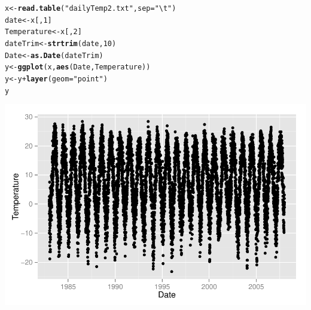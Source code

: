 \documentclass{article}\usepackage{graphicx, color}
\makeatletter
\def\maxwidth{ %
  \ifdim\Gin@nat@width>\linewidth
    \linewidth
  \else
    \Gin@nat@width
  \fi
}
\newcommand{\hlfunctioncall}[1]{\textcolor[rgb]{0.501960784313725,0,0.329411764705882}{\textbf{#1}}}%
\newcommand{\hlstring}[1]{\textcolor[rgb]{0.6,0.6,1}{#1}}%
\newenvironment{kframe}{%
 \def\at@end@of@kframe{}%
 \ifinner\ifhmode%
  \def\at@end@of@kframe{\end{minipage}}%
  \begin{minipage}{\columnwidth}%
 \fi\fi%
 \def\FrameCommand##1{\hskip\@totalleftmargin \hskip-\fboxsep
 \colorbox{shadecolor}{##1}\hskip-\fboxsep
     \hskip-\linewidth \hskip-\@totalleftmargin \hskip\columnwidth}%
 \MakeFramed {\advance\hsize-\width
   \@totalleftmargin\z@ \linewidth\hsize
   \@setminipage}}%
 {\par\unskip\endMakeFramed%
 \at@end@of@kframe}
\newenvironment{knitrout}{}{} %
\makeatother
\begin{document}
\begin{knitrout}
\color{fgcolor}\begin{kframe}
\begin{alltt}
x <- \hlfunctioncall{read.table}(\hlstring{"dailyTemp2.txt"}, sep = \hlstring{"\textbackslash{}t"})
date <- x[, 1]
Temperature <- x[, 2]
dateTrim <- \hlfunctioncall{strtrim}(date, 10)
Date <- \hlfunctioncall{as.Date}(dateTrim)
y <- \hlfunctioncall{ggplot}(x, \hlfunctioncall{aes}(Date, Temperature))
y <- y + \hlfunctioncall{layer}(geom = \hlstring{"point"})
y
\end{alltt}


{\ttfamily\noindent\color{warningcolor}{\#\# Warning: Removed 1 rows containing missing values (geom\_point).}}\end{kframe}
\includegraphics[width=\maxwidth]{figure/graph3} 

\end{knitrout}
\end{document}

